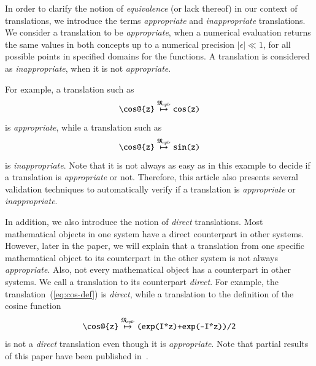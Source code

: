 \documentclass[a4paper,11pt]{article}
\newcommand{\langMaple}{\mathfrak{M}_{aple}}
\theoremstyle{defTheoStyle}
\theoremstyle{defExampStyle}
\begin{document}
In order to clarify the notion of \textit{equivalence} (or lack thereof) in our context of translations,
we introduce the terms \textit{appropriate} and \textit{inappropriate} translations. 
We consider a translation to be {\it appropriate}, when a numerical evaluation returns the 
same values in both concepts up to a numerical precision $|\epsilon|\ll 1$, for all possible 
points in specified domains for the functions.
A translation is considered as {\it inappropriate}, when it is not {\it appropriate}.

For example, a translation such as
\begin{equation}\label{eq:cos-def}
\verb|\cos@{z}| \overset{\langMaple}{\mapsto} \verb|cos(z)|
\end{equation}
is \textit{appropriate}, while a translation such as
\begin{equation}
\verb|\cos@{z}| \overset{\langMaple}{\mapsto} \verb|sin(z)|
\end{equation}
is \textit{inappropriate}. Note that it is not always as easy as in this example to decide if a translation is {\it appropriate} or not. Therefore, this article also presents several validation techniques to automatically verify if a translation is {\it appropriate} or {\it inappropriate}. 

In addition, we also introduce the notion of \textit{direct} translations. Most mathematical objects in one system have a direct counterpart in other systems. However, later in the paper, we will explain that a translation from one specific mathematical object to its counterpart in the other system is not always \textit{appropriate}. Also, not every mathematical object has a counterpart in other systems. We call a translation to its counterpart \textit{direct}. For example, the translation~(\ref{eq:cos-def}) is \textit{direct}, while a translation to the definition of the cosine function
\begin{equation*}
\verb|\cos@{z}| \overset{\langMaple}{\mapsto} \verb|(exp(I*z)+exp(-I*z))/2|
\end{equation*}
is not a \textit{direct} translation even though it is {\it appropriate}.
Note that partial results of this paper have been published in~\parencite{CICM:Paper}.
 
\end{document}
